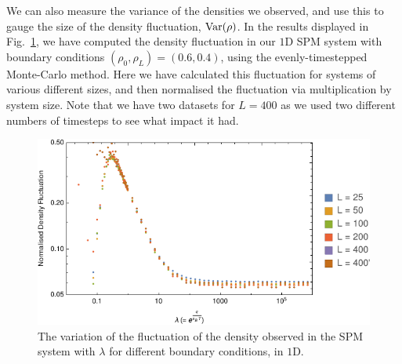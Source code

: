 We can also measure the variance of the densities we observed, and use this to gauge the size of the
density fluctuation, $\mathrm{Var}(\rho)$. In the results displayed in Fig.~\ref{fig:lambdaScanDensityFluc}, we have
computed the density fluctuation in our $1$D SPM system with boundary conditions
$(\rho_0, \rho_L) = (0.6, 0.4)$, using the evenly-timestepped Monte-Carlo method. Here we have
calculated this fluctuation for systems of various different sizes, and then normalised the fluctuation
via multiplication by system size. Note that we have two datasets for $L=400$ as we used two different
numbers of timesteps to see what impact it had.
\begin{figure} \caption[The variation of the fluctuation of the  density of the SPM system with 
$\lambda$ for different boundary conditions, in $1$D.]{The variation of the fluctuation of the density
observed in the SPM system with $\lambda$ for different boundary conditions, in $1$D.} 
\label{fig:lambdaScanDensityFluc}
\begin{center}
\includegraphics[width=0.95\textheight, angle=270]{numerics/images/lambdaScan/normDenFluc}
\end{center}
\end{figure}

